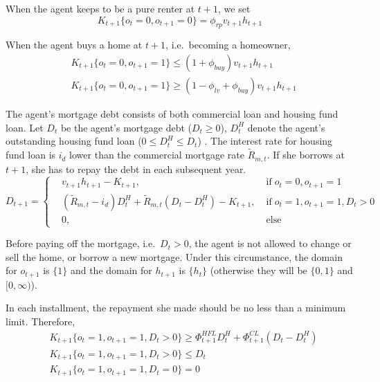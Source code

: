 \documentclass[
  12pt,
]{article}
\begin{document}
When the agent keeps to be a pure renter at \(t+1\), we set
\begin{equation}
K_{t+1}\{o_t = 0,o_{t+1} = 0\} = 
\phi_{rp} v_{t+1}h_{t+1}
\end{equation}

When the agent buys a home at \(t+1\), i.e.~becoming a homeowner,
\begin{equation}
\begin{aligned}
& K_{t+1}\{o_t = 0,o_{t+1} = 1\} \leq (1+\phi_{buy})v_{t+1}h_{t+1}\\
& K_{t+1}\{o_t = 0,o_{t+1} = 1\} \geq (1-\phi_{lv}+\phi_{buy})v_{t+1}h_{t+1}
\end{aligned}
\end{equation}

The agent's mortgage debt consists of both commercial loan and housing
fund loan. Let \(D_t\) be the agent's mortgage debt (\(D_t\geq0\)),
\(D^H_t\) denote the agent's outstanding housing fund loan
(\(0\leq D^H_t\leq D_t\)) . The interest rate for housing fund loan is
\(i_d\) lower than the commercial mortgage rate \(\tilde{R}_{m,t}\). If
she borrows at \(t+1\), she has to repay the debt in each subsequent
year. \begin{equation}\label{eq:CL}
D_{t+1} = \left\{
\begin{aligned}
& v_{t+1}h_{t+1}-K_{t+1}, & \; \text{if} \; o_t = 0,o_{t+1} = 1 \\
& (\tilde{R}_{m,t}-i_d)D^H_t + \tilde{R}_{m,t}(D_t-D^H_t) - K_{t+1}, & \; \text{if} \;o_t=1,o_{t+1}=1, D_t>0 \\
& 0, & \; \text{else}
\end{aligned}\right.
\end{equation}

Before paying off the mortgage, i.e.~\(D_t>0\), the agent is not allowed
to change or sell the home, or borrow a new mortgage. Under this
circumstance, the domain for \(o_{t+1}\) is \(\{1\}\) and the domain for
\(h_{t+1}\) is \(\{h_t\}\) (otherwise they will be \(\{0,1\}\) and
\([0,\infty)\)).

In each installment, the repayment she made should be no less than a
minimum limit. Therefore, \begin{equation}
\begin{aligned}
& K_{t+1}\{o_t=1,o_{t+1}=1,D_t>0\} \geq \Phi^{HFL}_{t+1} D^H_t + \Phi^{CL}_{t+1}(D_t - D^H_t) \\
& K_{t+1}\{o_t=1,o_{t+1}=1,D_t>0\} \leq D_t \\
& K_{t+1}\{o_t=1,o_{t+1}=1,D_t=0\} = 0
\end{aligned}
\end{equation}
\end{document}
